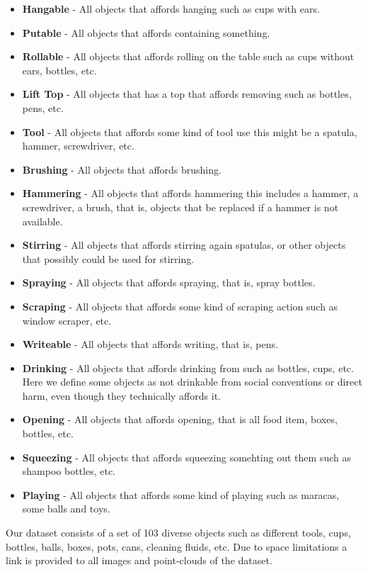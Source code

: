 \begin{itemize}
\tightlist
\item
  \textbf{Hangable} - All objects that affords hanging such as cups with
  ears.
\item
  \textbf{Putable} - All objects that affords containing something.
\item
  \textbf{Rollable} - All objects that affords rolling on the table such
  as cups without ears, bottles, etc.
\item
  \textbf{Lift Top} - All objects that has a top that affords removing
  such as bottles, pens, etc.
\item
  \textbf{Tool} - All objects that affords some kind of tool use this
  might be a spatula, hammer, screwdriver, etc.
\item
  \textbf{Brushing} - All objects that affords brushing.
\item
  \textbf{Hammering} - All objects that affords hammering this includes
  a hammer, a screwdriver, a brush, that is, objects that be replaced if
  a hammer is not available.
\item
  \textbf{Stirring} - All objects that affords stirring again spatulas,
  or other objects that possibly could be used for stirring.
\item
  \textbf{Spraying} - All objects that affords spraying, that is, spray
  bottles.
\item
  \textbf{Scraping} - All objects that affords some kind of scraping
  action such as window scraper, etc.
\item
  \textbf{Writeable} - All objects that affords writing, that is, pens.
\item
  \textbf{Drinking} - All objects that affords drinking from such as
  bottles, cups, etc. Here we define some objects as not drinkable from
  social conventions or direct harm, even though they technically
  affords it.
\item
  \textbf{Opening} - All objects that affords opening, that is all food
  item, boxes, bottles, etc.
\item
  \textbf{Squeezing} - All objects that affords squeezing somehting out
  them such as shampoo bottles, etc.
\item
  \textbf{Playing} - All objects that affords some kind of playing such
  as maracas, some balls and toys.
\end{itemize}

\normalsize

Our dataset consists of a set of 103 diverse objects such as different
tools, cups, bottles, balls, boxes, pots, cans, cleaning fluids, etc.
Due to space limitations a link is provided to all images and
point-clouds of the dataset.


